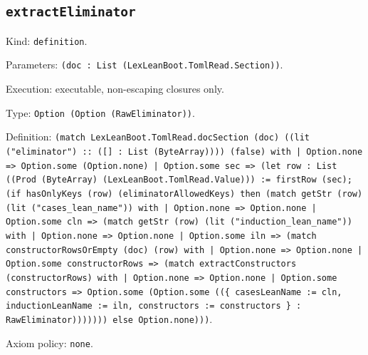 \documentclass[11pt]{article}
\begin{document}
\subsection*{\texttt{extractEliminator}}
\noindent Kind: \texttt{definition}.\par
\noindent Parameters: \texttt{(doc : List (LexLeanBoot.TomlRead.Section))}.\par
\noindent Execution: executable, non-escaping closures only.\par
\noindent Type: \texttt{Option (Option (RawEliminator))}.\par
\noindent Definition: \texttt{(match LexLeanBoot.TomlRead.docSection (doc) ((lit ("eliminator") :: ([] : List (ByteArray)))) (false) with | Option.none => Option.some (Option.none) | Option.some sec => (let row : List ((Prod (ByteArray) (LexLeanBoot.TomlRead.Value))) := firstRow (sec); (if hasOnlyKeys (row) (eliminatorAllowedKeys) then (match getStr (row) (lit ("cases\_lean\_name")) with | Option.none => Option.none | Option.some cln => (match getStr (row) (lit ("induction\_lean\_name")) with | Option.none => Option.none | Option.some iln => (match constructorRowsOrEmpty (doc) (row) with | Option.none => Option.none | Option.some constructorRows => (match extractConstructors (constructorRows) with | Option.none => Option.none | Option.some constructors => Option.some (Option.some ((\{ casesLeanName := cln, inductionLeanName := iln, constructors := constructors \} : RawEliminator))))))) else Option.none)))}.\par
\noindent Axiom policy: \texttt{none}.\par
\end{document}
